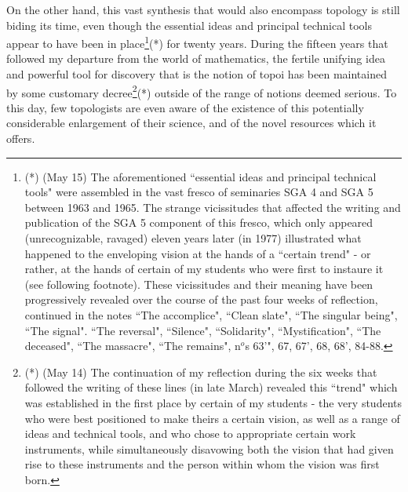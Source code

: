 On the other hand, this vast synthesis that would also encompass topology
is still biding its time, even though
the essential ideas and principal technical tools
appear to have been in place\footnote{(*) (May 15) The aforementioned ``essential ideas
and principal technical tools" were assembled in the vast fresco of seminaries SGA 4 and
SGA 5 between 1963 and 1965. The strange vicissitudes that affected the writing and
publication of the SGA 5 component of this fresco, which only appeared (unrecognizable,
ravaged) eleven years later (in 1977) illustrated what happened to the enveloping vision
at the hands of a ``certain trend" - or rather, at the hands of certain of my students who
were first to instaure it (see following footnote). These vicissitudes and their meaning
have been progressively revealed over the course of the past four weeks of reflection,
continued in the notes ``The accomplice", ``Clean slate", ``The singular being", ``The
signal". ``The reversal", ``Silence", ``Solidarity", ``Mystification", ``The deceased",
``The massacre", ``The remains", n$^o$s 63'", 67, 67', 68, 68', 84-88.}(*) for twenty years. 
During the fifteen years that followed my departure from the world of mathematics, the
fertile unifying idea and powerful tool for discovery that is the notion of topoi has been
maintained by some customary decree\footnote{(*) (May 14) The continuation of my reflection during the six weeks that followed
the writing of these lines (in late March) revealed this ``trend" which was established in
the first place by certain of my students - the very students who were best positioned to
make theirs a certain vision, as well as a range of ideas and technical tools, and who
chose to appropriate certain work instruments, while simultaneously disavowing both the
vision that had given rise to these instruments and the person within whom the vision was
first born.}(*) outside of the range of notions deemed
serious. To this day, few topologists are even aware of the existence of this
potentially considerable enlargement of their science, and of the novel resources which it
offers. 

